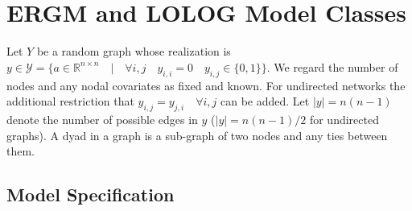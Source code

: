\documentclass[
]{statsoc}
\begin{document}
\section{ERGM and LOLOG Model Classes}\label{sec:LOLOG}

Let \(Y\) be a random graph whose realization is
\(y \in \mathscr{Y} = \lbrace a \in \mathbb{R}^{n \times n} \quad \vert \quad \forall i,j \quad y_{i,i} = 0 \quad y_{i,j} \in \lbrace 0,1 \rbrace\rbrace\).
We regard the number of nodes and any nodal covariates as fixed and
known. For undirected networks the additional restriction that
\(y_{i,j} = y_{j,i} \quad\forall i,j\) can be added. Let \(|y|=n(n-1)\)
denote the number of possible edges in \(y\) (\(|y|=n(n-1)/2\) for
undirected graphs). A dyad in a graph is a sub-graph of two nodes and
any ties between them.

\subsection{Model Specification}
\end{document}

